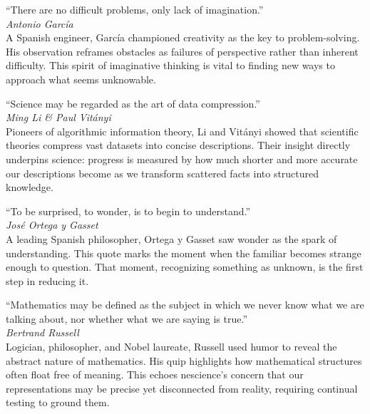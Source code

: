 \vspace{1em}

\noindent
\textquotedblleft There are no difficult problems, only lack of imagination.\textquotedblright \\
\emph{Antonio García} \\
A Spanish engineer, García championed creativity as the key to problem-solving. His observation reframes obstacles as failures of perspective rather than inherent difficulty. This spirit of imaginative thinking is vital to finding new ways to approach what seems unknowable.

\vspace{1em}

\noindent
\textquotedblleft Science may be regarded as the art of data compression.\textquotedblright \\
\emph{Ming Li \& Paul Vitányi} \\
Pioneers of algorithmic information theory, Li and Vitányi showed that scientific theories compress vast datasets into concise descriptions. Their insight directly underpins science: progress is measured by how much shorter and more accurate our descriptions become as we transform scattered facts into structured knowledge.

\vspace{1em}

\noindent
\textquotedblleft To be surprised, to wonder, is to begin to understand.\textquotedblright \\
\emph{José Ortega y Gasset} \\
A leading Spanish philosopher, Ortega y Gasset saw wonder as the spark of understanding. This quote marks the moment when the familiar becomes strange enough to question. That moment, recognizing something as unknown, is the first step in reducing it.

\vspace{1em}

\noindent
\textquotedblleft Mathematics may be defined as the subject in which we never know what we are talking about, nor whether what we are saying is true.\textquotedblright \\
\emph{Bertrand Russell} \\
Logician, philosopher, and Nobel laureate, Russell used humor to reveal the abstract nature of mathematics. His quip highlights how mathematical structures often float free of meaning. This echoes nescience's concern that our representations may be precise yet disconnected from reality, requiring continual testing to ground them.

